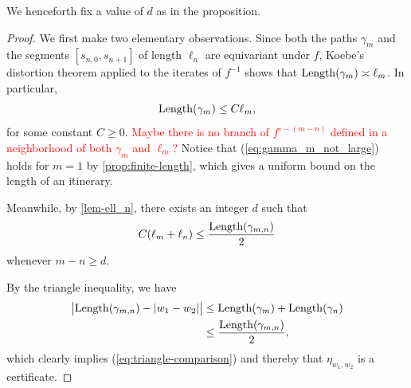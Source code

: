We henceforth fix a value of $d$ as in the proposition.
\begin{proof} 
We first make two elementary observations. Since both the paths $\gamma_m$ and the segments $[s_{n,0},s_{n+1}]$ of length $\ell_n$ are equivariant under $f$, Koebe's distortion theorem applied to the iterates of $f^{-1}$ shows that $\operatorname{Length}(\gamma_m) \asymp \ell_m$. In particular,
\begin{equation} \label{eq:gamma_m_not_large}
		\operatorname{Length}(\gamma_m) \leq C \ell_m,
	\end{equation}
for some constant $C \geq 0$.  \textcolor{red}{Maybe there is no branch of $f^{\circ -(m-n)}$ defined in a neighborhood of both $\gamma_m$ and $\ell_m$?} Notice that (\ref{eq:gamma_m_not_large}) holds for $m=1$ by \cref{prop:finite-length}, which gives a uniform bound on the length of an itinerary.

Meanwhile, by \cref{lem-ell_n}, there exists an integer $d$ such that
\begin{align}
C(\ell_m + \ell _n) \leq \frac{\operatorname{Length}(\gamma_{m,n})}{2}
\end{align}
whenever $m-n \geq d$.

By the triangle inequality, we have
\begin{align*} 
		\bigl | \operatorname{Length}(\gamma_{m,n}) - |w_1-w_2| \bigr | & \le \operatorname{Length}(\gamma_m)+\operatorname{Length}(\gamma_n) \\
		& \le \frac{\operatorname{Length}(\gamma_{m,n})}{2},
\end{align*}
which clearly implies (\ref{eq:triangle-comparison}) and thereby that $\eta_{w_1,w_2}$ is a certificate.
\end{proof}

\bigskip

\begin{figure}
    \centering
{}
  \label{fig:proof-triangle-ineq}
\end{figure}


